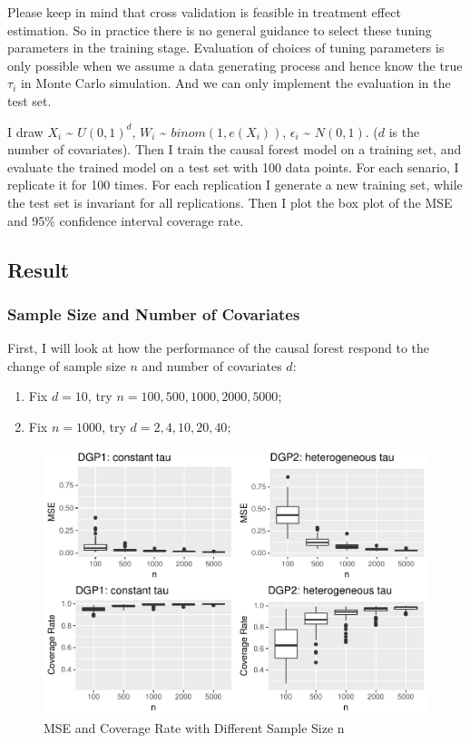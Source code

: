 \documentclass[]{article}
\begin{document}
Please keep in mind that cross validation is feasible in treatment
effect estimation. So in practice there is no general guidance to select
these tuning parameters in the training stage. Evaluation of choices of
tuning parameters is only possible when we assume a data generating
process and hence know the true \(\tau_{i}\) in Monte Carlo simulation.
And we can only implement the evaluation in the test set.

I draw \(X_{i}\) \textasciitilde{} \(U(0,1)^{d}\), \(W_{i}\)
\textasciitilde{} \(binom(1,e(X_{i}))\), \(\epsilon_{i}\)
\textasciitilde{} \(N(0,1)\). (\(d\) is the number of covariates). Then
I train the causal forest model on a training set, and evaluate the
trained model on a test set with 100 data points. For each senario, I
replicate it for 100 times. For each replication I generate a new
training set, while the test set is invariant for all replications. Then
I plot the box plot of the MSE and 95\% confidence interval coverage
rate.

\subsection{Result}\label{result}

\subsubsection{Sample Size and Number of
Covariates}\label{sample-size-and-number-of-covariates}

First, I will look at how the performance of the causal forest respond
to the change of sample size \(n\) and number of covariates \(d\):

\begin{enumerate}
\def\labelenumi{\arabic{enumi}.}
\item
  Fix \(d=10\), try \(n=100, 500, 1000, 2000, 5000\);
\item
  Fix \(n=1000\), try \(d=2, 4, 10, 20, 40\);
\end{enumerate}

\begin{figure}
\centering
\includegraphics{report_files/figure-latex/fig1-1.pdf}
\caption{\label{fig:fig1}MSE and Coverage Rate with Different Sample
Size n}
\end{figure}
\end{document}
